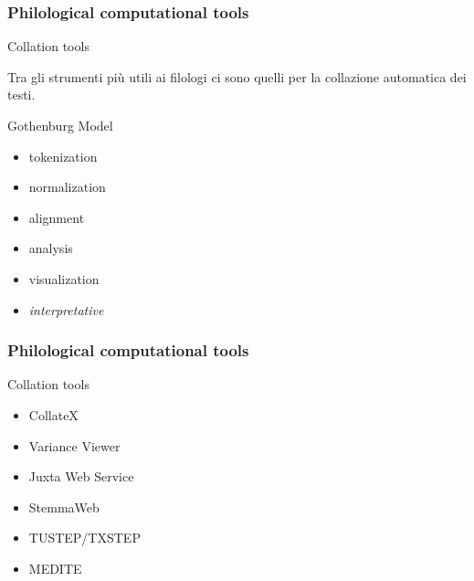 \begin{frame}
	\frametitle{Philological computational tools}
	\addtocounter{nframe}{1}
    \begin{block}{Collation tools}
            
        \begin{center}
            Tra gli strumenti più utili ai filologi ci sono quelli per la collazione automatica dei testi.

		\end{center}
    \end{block}
    
    \begin{block}{Gothenburg Model}
            \begin{itemize}
                \item tokenization
                \item normalization
                \item alignment
                \item analysis
                \item visualization
                \item \textit{interpretative}
            \end{itemize}
    \end{block}
\end{frame}

\begin{frame}
	\frametitle{Philological computational tools}
	\addtocounter{nframe}{1}
    \begin{block}{Collation tools}
		\begin{itemize}
			\item CollateX
			\item Variance Viewer
			\item Juxta Web Service
			\item StemmaWeb
			\item TUSTEP/TXSTEP
			\item MEDITE
		\end{itemize}
	\end{block}
\end{frame}

